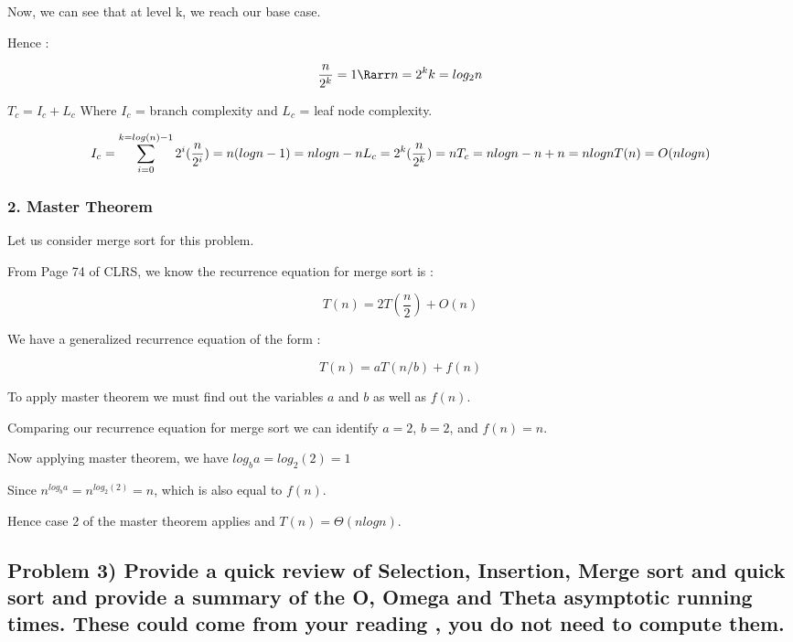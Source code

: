\documentclass[
]{article}
\begin{document}
Now, we can see that at level k, we reach our base case.

Hence :

\[\frac{n}{2^k} = 1 \\ 
\Rarr n = 2^k \\
k = log_2n\\\]

\(T_c = I_c+L_c\) Where \(I_c\) = branch complexity and \(L_c\) = leaf
node complexity.

\[I_c = \sum_{i=0}^{k = log(n)-1} 2^i(\frac{n}{2^i}) = n(logn-1) = nlogn - n \\
L_c = 2^k(\frac{n}{2^k}) = n\\
T_c = nlogn - n +n = nlogn\\\\
T(n) = O(nlogn)\]

\subsubsection{2. Master Theorem}\label{2-master-theorem}

Let us consider merge sort for this problem.

From Page 74 of CLRS, we know the recurrence equation for merge sort is
:

\[T(n) = 2T(\frac{n}{2})+O(n)\]

We have a generalized recurrence equation of the form :

\[T(n) = aT(n/b) + f(n)\]

To apply master theorem we must find out the variables \(a\) and \(b\)
as well as \(f(n)\).

Comparing our recurrence equation for merge sort we can identify
\(a=2\), \(b =2\), and \(f(n) = n\).

Now applying master theorem, we have \(log_ba = log_2(2) = 1\)

Since \(n^{log_ba}= n^{log_2(2)} = n\), which is also equal to \(f(n)\).

Hence case 2 of the master theorem applies and \(T(n) = \Theta(nlogn)\).

\subsection{Problem 3) Provide a quick review of Selection, Insertion,
Merge sort and quick sort and provide a summary of the O, Omega and
Theta asymptotic running times. These could come from your reading , you
do not need to compute
them.}\label{problem-3-provide-a-quick-review-of-selection-insertion-merge-sort-and-quick-sort-and-provide-a-summary-of-the-o-omega-and-theta-asymptotic-running-times-these-could-come-from-your-reading--you-do-not-need-to-compute-them}
\end{document}

